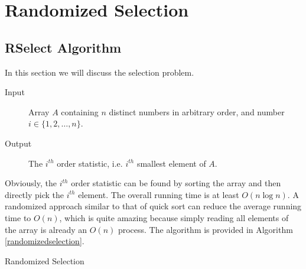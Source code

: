 \section{Randomized Selection}
\subsection{RSelect Algorithm}
In this section we will discuss the selection problem.
\begin{description}
\item[Input]Array $A$ containing $n$ distinct numbers in arbitrary order, and number $i\in\{1,2,\dots,n\}$. 
\item[Output]The $i^{th}$ order statistic, i.e. $i^{th}$ smallest element of $A$.
\end{description}
Obviously, the $i^{th}$ order statistic can be found by sorting the array and then directly pick the $i^{th}$ element. The overall running time is at least $O(n\log n)$. A randomized approach similar to that of quick sort can reduce the average running time to $O(n)$, which is quite amazing because simply reading all elements of the array is already an $O(n)$ process. The algorithm is provided in Algorithm \ref{randomizedselection}. 
\begin{algorithm}[ht]
\caption{Randomized Selection}\label{randomizedselection}
\begin{algorithmic}[1]
\Input{}
\Output{}
\EndIf
{}
\Else{}
\EndIf
\EndFunction
\end{algorithmic}
\end{algorithm}
